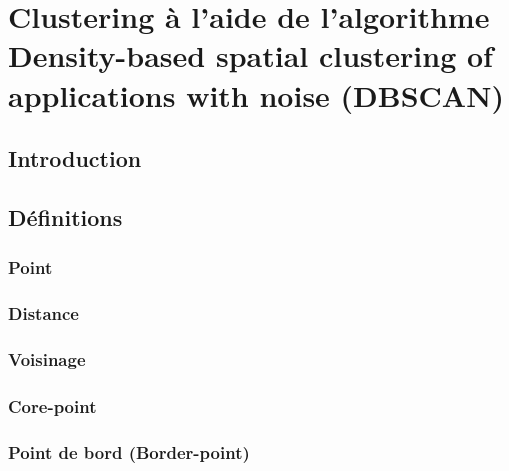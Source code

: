 \chapter{Clustering à l'aide de l'algorithme Density-based spatial clustering of applications with noise (DBSCAN)}
\section{Introduction}
\section{Définitions}
\paragraph{}
\subsection{Point}
\paragraph{}
\subsection{Distance}\label{transaction}
\paragraph{}
\subsection{Voisinage}
\paragraph{}
\subsection{Core-point}
\paragraph{}
\subsection{Point de bord (Border-point)}
\paragraph{}
